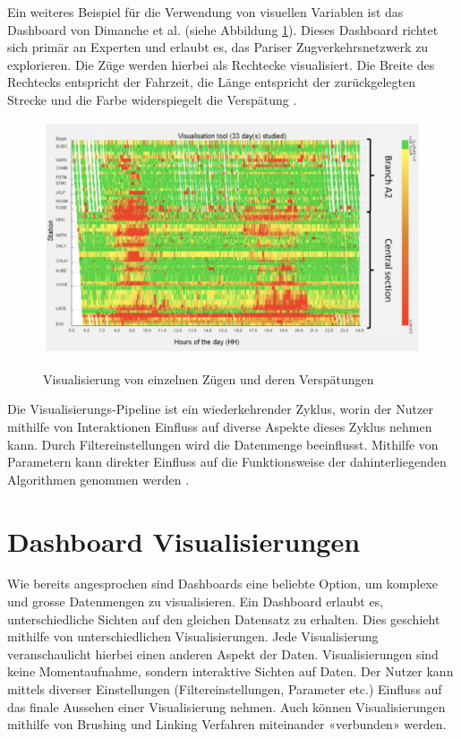 Ein weiteres Beispiel für die Verwendung von visuellen Variablen ist das Dashboard von Dimanche et al. (siehe Abbildung \ref{fig_massive_railway_visualization}). Dieses Dashboard richtet sich primär an Experten und erlaubt es, das Pariser Zugverkehrsnetzwerk zu explorieren. Die Züge werden hierbei als Rechtecke visualisiert. Die Breite des Rechtecks entspricht der Fahrzeit, die Länge entspricht der zurückgelegten Strecke und die Farbe widerspiegelt die Verspätung \parencite{visualization_tool_operating_experts_2017}.

\begin{figure}[H]
    \caption{Visualisierung von einzelnen Zügen und deren Verspätungen \parencite[S. 15843]{visualization_tool_operating_experts_2017}}
    \includegraphics[width=.5\linewidth]{content/00_assets/massive_railway_visualization.png}
    \label{fig_massive_railway_visualization}
\end{figure}

Die Visualisierungs-Pipeline ist ein wiederkehrender Zyklus, worin der Nutzer mithilfe von Interaktionen Einfluss auf diverse Aspekte dieses Zyklus nehmen kann. Durch Filtereinstellungen wird die Datenmenge beeinflusst. Mithilfe von Parametern kann direkter Einfluss auf die Funktionsweise der dahinterliegenden Algorithmen genommen werden \parencite[S.2971]{survey_traffic_data_visualization_2015}.

\section{Dashboard Visualisierungen}
Wie bereits angesprochen sind Dashboards eine beliebte Option, um komplexe und grosse Datenmengen zu visualisieren. Ein Dashboard erlaubt es, unterschiedliche Sichten auf den gleichen Datensatz zu erhalten. Dies geschieht mithilfe von unterschiedlichen Visualisierungen. Jede Visualisierung veranschaulicht hierbei einen anderen Aspekt der Daten. Visualisierungen sind keine Momentaufnahme, sondern interaktive Sichten auf Daten. Der Nutzer kann mittels diverser Einstellungen (Filtereinstellungen, Parameter etc.) Einfluss auf das finale Aussehen einer Visualisierung nehmen. Auch können Visualisierungen mithilfe von Brushing und Linking Verfahren miteinander «verbunden» werden. 

